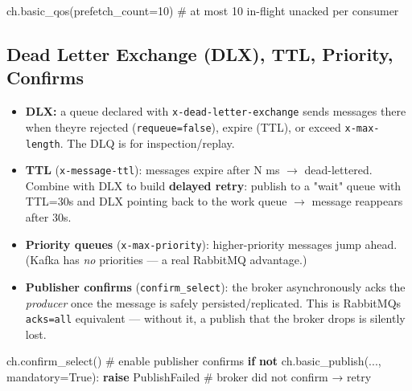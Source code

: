 \documentclass[11pt]{article}
\providecommand{\tightlist}{\setlength{\itemsep}{1pt}\setlength{\parskip}{0pt}}
\newenvironment{Shaded}{\begin{snugshade}}{\end{snugshade}}
\newcommand{\CommentTok}[1]{\textcolor[rgb]{0.48,0.49,0.49}{#1}}
\newcommand{\ControlFlowTok}[1]{\textcolor[rgb]{0.99,0.74,0.29}{\textbf{#1}}}
\newcommand{\DecValTok}[1]{\textcolor[rgb]{0.96,0.45,0.00}{#1}}
\newcommand{\KeywordTok}[1]{\textcolor[rgb]{0.81,0.81,0.76}{\textbf{#1}}}
\newcommand{\NormalTok}[1]{\textcolor[rgb]{0.81,0.81,0.76}{#1}}
\newcommand{\OperatorTok}[1]{\textcolor[rgb]{0.81,0.81,0.76}{#1}}
\newcommand{\VariableTok}[1]{\textcolor[rgb]{0.15,0.68,0.68}{#1}}
\begin{document}

\begin{Shaded}
\begin{Highlighting}[]
\NormalTok{ch.basic\_qos(prefetch\_count}\OperatorTok{=}\DecValTok{10}\NormalTok{)   }\CommentTok{\# at most 10 in{-}flight unacked per consumer}
\end{Highlighting}
\end{Shaded}

\subsection{Dead Letter Exchange (DLX), TTL, Priority, Confirms}\label{dead-letter-exchange-dlx-ttl-priority-confirms}

\begin{itemize}
\tightlist
\item
  \textbf{DLX:} a queue declared with \texttt{x-dead-letter-exchange} sends messages there when they\textquotesingle re rejected (\texttt{requeue=false}), expire (TTL), or exceed \texttt{x-max-length}. The DLQ is for inspection/replay.
\item
  \textbf{TTL} (\texttt{x-message-ttl}): messages expire after N ms \(\rightarrow\) dead-lettered. Combine with DLX to build \textbf{delayed retry}: publish to a "wait" queue with TTL=30s and DLX pointing back to the work queue \(\rightarrow\) message reappears after 30s.
\item
  \textbf{Priority queues} (\texttt{x-max-priority}): higher-priority messages jump ahead. (Kafka has \emph{no} priorities --- a real RabbitMQ advantage.)
\item
  \textbf{Publisher confirms} (\texttt{confirm\_select}): the broker asynchronously acks the \emph{producer} once the message is safely persisted/replicated. This is RabbitMQ\textquotesingle s \texttt{acks=all} equivalent --- without it, a publish that the broker drops is silently lost.
\end{itemize}


\begin{Shaded}
\begin{Highlighting}[]
\NormalTok{ch.confirm\_select()                       }\CommentTok{\# enable publisher confirms}
\ControlFlowTok{if} \KeywordTok{not}\NormalTok{ ch.basic\_publish(..., mandatory}\OperatorTok{=}\VariableTok{True}\NormalTok{):}
    \ControlFlowTok{raise}\NormalTok{ PublishFailed                   }\CommentTok{\# broker did not confirm → retry}
\end{Highlighting}
\end{Shaded}
\end{document}
